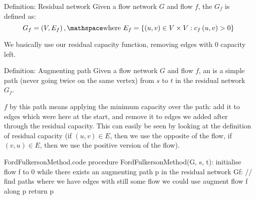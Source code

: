 \documentclass[a4paper]{article}
\begin{document}
\begin{parag}{Definition: Residual network}
    Given a flow network $G$ and flow $f$, the  $G_f$ is defined as: 
    \[G_f = \left(V, E_f\right), \mathspace \text{where } E_f = \left\{\left(u, v\right) \in V \times V : c_{f}\left(u, v\right) > 0\right\}\]

    We basically use our residual capacity function, removing edges with 0 capacity left.
\end{parag}

\begin{parag}{Definition: Augmenting path}
    Given a flow network $G$ and flow $f$, an  is a simple path (never going twice on the same vertex) from $s$ to $t$ in the residual network $G_f$. 

    $f$ by this path means applying the minimum capacity over the path: add it to edges which were here at the start, and remove it to edges we added after through the residual capacity. This can easily be seen by looking at the definition of residual capacity (if $\left(u, v\right) \in E$, then we use the opposite of the flow, if $\left(v, u\right) \in E$, then we use the positive version of the flow).
\end{parag}


\begin{filecontents*}[overwrite]{FordFulkersonMethod.code}
procedure FordFulkersonMethod(G, s, t):
    initialise flow f to 0
    while there exists an augmenting path p in the residual network Gf:  // find paths where we have edges with still some flow we could use
        augment flow f along p
    return p
\end{filecontents*}
\end{document}
